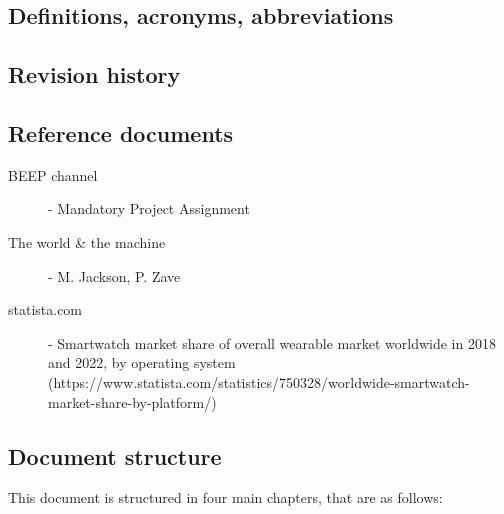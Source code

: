 \documentclass[../main.tex]{subfiles}
\begin{document}
%
%
%
%
%

\subsection{Definitions, acronyms, abbreviations}
\subsection{Revision history}
\subsection{Reference documents}

\begin{description}
	\item [BEEP channel] - Mandatory Project Assignment
	\item [The world \& the machine] - M. Jackson, P. Zave
	\item [statista.com] - Smartwatch market share of overall wearable market worldwide in 2018 and 2022, by operating system (https://www.statista.com/statistics/750328/worldwide-smartwatch-market-share-by-platform/)
\end{description}

\subsection{Document structure}

This document is structured in four main chapters, that are as follows:
\end{document}
